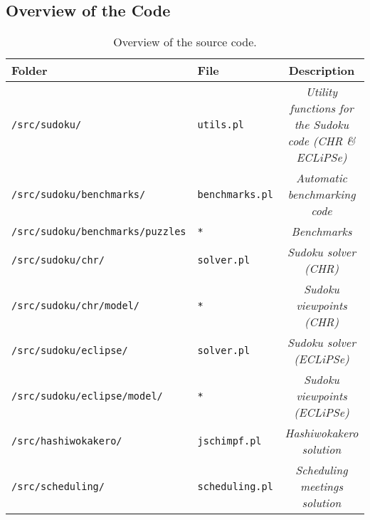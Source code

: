 \subsection*{Overview of the Code}\label{sec:code}

\begin{table}[H]
\centering
\bgroup
\def\arraystretch{1.3}
\begin{tabular}{llc}
Folder & File & Description \\ \hline
\texttt{/src/sudoku/} & \texttt{utils.pl} & \textit{Utility functions for the Sudoku code (CHR \& ECLiPSe)} \\    
\texttt{/src/sudoku/benchmarks/} & \texttt{benchmarks.pl} & \textit{Automatic benchmarking code} \\    
\texttt{/src/sudoku/benchmarks/puzzles} & \texttt{*} & \textit{Benchmarks} \\    
\texttt{/src/sudoku/chr/} & \texttt{solver.pl} & \textit{Sudoku solver (CHR)} \\    
\texttt{/src/sudoku/chr/model/} & \texttt{*} & \textit{Sudoku viewpoints (CHR)} \\    
\texttt{/src/sudoku/eclipse/} & \texttt{solver.pl} & \textit{Sudoku solver (ECLiPSe)} \\    
\texttt{/src/sudoku/eclipse/model/} & \texttt{*} & \textit{Sudoku viewpoints (ECLiPSe)} \\\hline
\texttt{/src/hashiwokakero/} & \texttt{jschimpf.pl} & \textit{Hashiwokakero solution} \\\hline
\texttt{/src/scheduling/} & \texttt{scheduling.pl} & \textit{Scheduling meetings solution} \\\hline  
\end{tabular}
\egroup
\caption{Overview of the source code.}
\label{tab:code}
\end{table}
